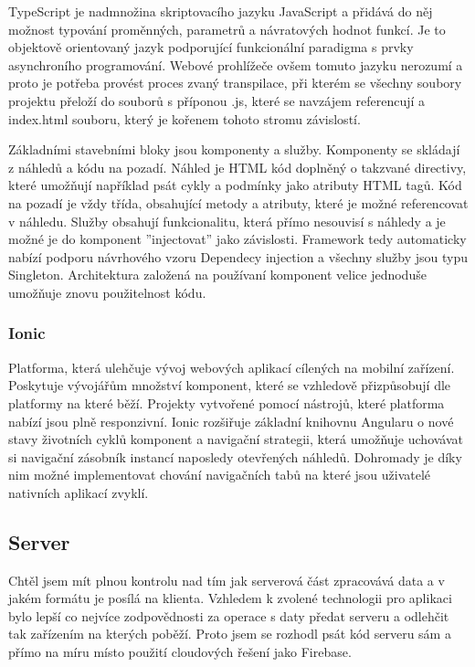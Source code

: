 \documentclass[
  biblatex,
  glossaries,
  index
]{kidiplom}
\begin{document}
TypeScript je nadmnožina skriptovacího jazyku JavaScript a přidává do něj možnost typování proměnných, parametrů a návratových hodnot funkcí. Je to objektově orientovaný jazyk podporující funkcionální paradigma s prvky asynchroního programování. Webové prohlížeče ovšem tomuto jazyku nerozumí a proto je potřeba provést proces zvaný transpilace, při kterém se všechny soubory projektu přeloží do souborů s příponou .js, které se navzájem referencují a index.html souboru, který je kořenem tohoto stromu závislostí.

Základními stavebními bloky jsou komponenty a služby. Komponenty se skládají z náhledů a kódu na pozadí. Náhled je HTML kód doplněný o takzvané directivy, které umožňují například psát cykly a podmínky jako atributy HTML tagů. Kód na pozadí je vždy třída, obsahující metody a atributy, které je možné referencovat v náhledu. Služby obsahují funkcionalitu, která přímo nesouvisí s náhledy a je možné je do komponent ''injectovat'' jako závislosti. \cite{8} Framework tedy automaticky nabízí podporu návrhového vzoru Dependecy injection a všechny služby jsou typu Singleton. Architektura založená na používaní komponent velice jednoduše umožňuje znovu použitelnost kódu.

\subsubsection{Ionic}
Platforma, která ulehčuje vývoj webových aplikací cílených na mobilní zařízení. Poskytuje vývojářům množství komponent, které se vzhledově přizpůsobují dle platformy na které běží. Projekty vytvořené pomocí nástrojů, které platforma nabízí jsou plně responzivní. Ionic rozšiřuje základní knihovnu Angularu o nové stavy životních cyklů komponent a navigační strategii, která umožňuje uchovávat si navigační zásobník instancí naposledy otevřených náhledů. Dohromady je díky nim možné implementovat chování navigačních tabů na které jsou uživatelé nativních aplikací zvyklí. 

\subsection{Server}
Chtěl jsem mít plnou kontrolu nad tím jak serverová část zpracovává data a v jakém formátu je posílá na klienta. Vzhledem k zvolené technologii pro aplikaci bylo lepší co nejvíce zodpovědnosti za operace s daty předat serveru a odlehčit tak zařízením na kterých poběží. Proto jsem se rozhodl psát kód serveru sám a přímo na míru místo použití cloudových řešení jako Firebase. 
\end{document}

